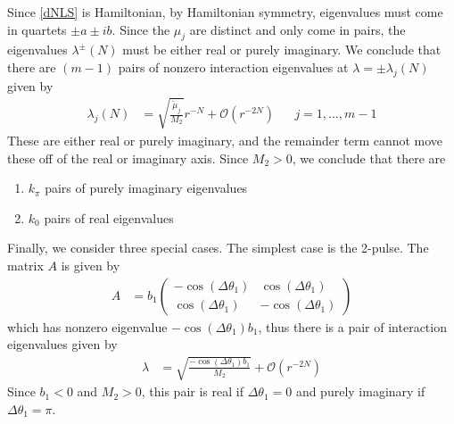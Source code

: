 \documentclass[12pt]{article}
\begin{document}
Since \eqref{dNLS} is Hamiltonian, by Hamiltonian symmetry, eigenvalues must come in quartets $\pm a \pm i b$. Since the $\mu_j$ are distinct and only come in pairs, the eigenvalues $\lambda^\pm(N)$ must be either real or purely imaginary. We conclude that there are $(m - 1)$ pairs of nonzero interaction eigenvalues at $\lambda = \pm \lambda_j(N)$ given by 
\begin{align}\label{inteigsDNLS}
\lambda_j(N) &= \sqrt{\frac{\tilde{\mu}_j}{M_2}}r^{-N} + \mathcal{O}(r^{-2N}) && j = 1, \dots, m-1
\end{align}
These are either real or purely imaginary, and the remainder term cannot move these off of the real or imaginary axis. Since $M_2 > 0$, we conclude that there are
\begin{enumerate}
	\item $k_\pi$ pairs of purely imaginary eigenvalues
	\item $k_0$ pairs of real eigenvalues
\end{enumerate}

Finally, we consider three special cases. The simplest case is the 2-pulse. The matrix $A$ is given by
\begin{align*}
A &= b_1 \begin{pmatrix}
-\cos(\Delta\theta_1) & \cos(\Delta\theta_1) \\
\cos(\Delta\theta_1) & -\cos(\Delta\theta_1) 
\end{pmatrix}
\end{align*}
which has nonzero eigenvalue $-\cos(\Delta\theta_1) b_1$, thus there is a pair of interaction eigenvalues given by
\begin{align*}
\lambda &= \sqrt{\frac{-\cos(\Delta\theta_1) b_1}{M_2}} + \mathcal{O}(r^{-2N})
\end{align*}
Since $b_1 < 0$ and $M_2 > 0$, this pair is real if $\Delta\theta_1 = 0$ and purely imaginary if $\Delta\theta_1 = \pi$.
\end{document}
